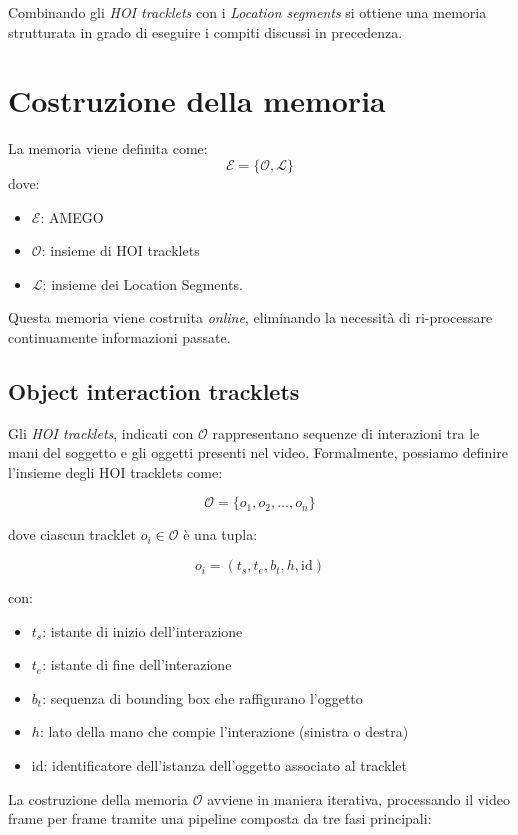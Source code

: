 Combinando gli \emph{HOI tracklets} con i \emph{Location segments} si ottiene una memoria strutturata in grado di eseguire i compiti discussi in precedenza.

\section{Costruzione della memoria}
La memoria viene definita come:
\[
\mathcal{E} = \{\mathcal{O}, \mathcal{L}\}
\]
dove:
\begin{itemize}
    \item $\mathcal{E}$: AMEGO
    \item $\mathcal{O}$: insieme di HOI tracklets
    \item $\mathcal{L}$: insieme dei Location Segments.
\end{itemize}

Questa memoria viene costruita \emph{online}, eliminando la necessità di ri-processare continuamente informazioni passate.

\subsection*{Object interaction tracklets}
Gli \emph{HOI tracklets}, indicati con $\mathcal{O}$ rappresentano sequenze di interazioni tra le mani del soggetto e gli oggetti presenti nel video. Formalmente, possiamo definire l'insieme degli HOI tracklets come:

\[
\mathcal{O} = \{ o_1, o_2, \dots, o_n \}
\]

dove ciascun tracklet $o_i \in \mathcal{O}$ è una tupla:

\[
o_i = (t_s, t_e, b_t, h, \text{id})
\]

con:
\begin{itemize}
    \item $t_s$: istante di inizio dell'interazione
    \item $t_e$: istante di fine dell'interazione
    \item $b_t$: sequenza di bounding box che raffigurano l'oggetto
    \item $h$: lato della mano che compie l'interazione (sinistra o destra)
    \item $\text{id}$: identificatore dell'istanza dell'oggetto associato al tracklet
\end{itemize}

La costruzione della memoria $\mathcal{O}$ avviene in maniera iterativa, processando il video frame per frame tramite una pipeline composta da tre fasi principali:

